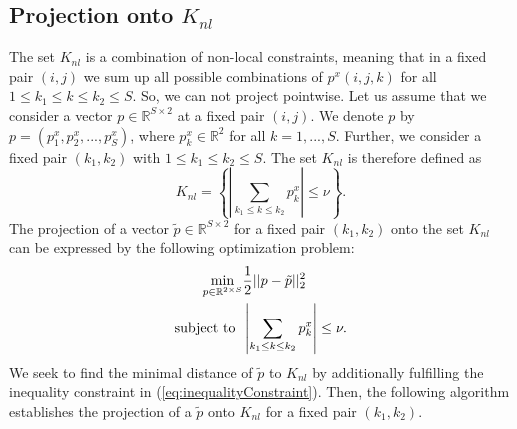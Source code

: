 \documentclass[abstracton]{scrreprt}
\begin{document}
        \subsection{Projection onto $K_{nl}$}
            \label{sub:projection_onto_K_nl}

            The set $K_{nl}$ is a combination of non-local constraints, meaning that in a fixed pair $(i,j)$ we sum up all possible combinations of $p^{x}(i,j,k)$ for all $1 \le k_{1} \le k \le k_{2} \le S$. So, we can not project pointwise. Let us assume that we consider a vector $p \in \mathbb{R}^{S \times 2}$ at a fixed pair $(i,j)$. We denote $p$ by $p = (p^{x}_{1}, p^{x}_{2}, ..., p^{x}_{S})$, where $p^{x}_{k} \in \mathbb{R}^{2}$ for all $k = 1, ..., S$. Further, we consider a fixed pair $(k_{1}, k_{2})$ with $1 \le k_{1} \le k_{2} \le S$. The set $K_{nl}$ is therefore defined as
                $$
                    K_{nl} = \left\{ \left| \sum_{k_{1} \le k \le k_{2}} p^{x}_{k} \right| \le \nu \right\}.
                $$
            The projection of a vector $\tilde{p} \in \mathbb{R}^{S \times 2}$ for a fixed pair $(k_{1}, k_{2})$ onto the set $K_{nl}$ can be expressed by the following optimization problem:
                \begin{subequations}
                    \begin{align}
                    \min\limits_{p \in \mathbb{R}^{2 \times S}} &\frac{1}{2} ||p - \tilde{p}||^{2}_{2} \label{eq:equalityConstraint} \\
                    \textnormal{subject to} \,\,\, &\left| \sum_{k_{1} \le k \le k_{2}} p^{x}_{k} \right| \le \nu. \label{eq:inequalityConstraint}
                    \end{align}
                    \label{eq:optimization_problem}
                \end{subequations}
            We seek to find the minimal distance of $\tilde{p}$ to $K_{nl}$ by additionally fulfilling the inequality constraint in (\ref{eq:inequalityConstraint}). Then, the following algorithm establishes the projection of a $\tilde{p}$ onto $K_{nl}$ for a fixed pair $(k_{1}, k_{2})$.
\end{document}
